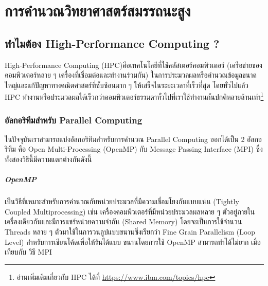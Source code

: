 

\chapter{การคำนวณวิทยาศาสตร์สมรรถนะสูง}
\label{ch:high_perf_comp}

\section{ทำไมต้อง High-Performance Computing ?}

High-Performance Computing (HPC)คือเทคโนโลยีที่ใช้คลัสเตอร์คอมพิวเตอร์ (เครือข่ายของคอมพิวเตอร์หลาย ๆ เครื่องที่เชื่อมต่อและทำงานร่วมกัน)
ในการประมวลผลหรือคำนวณข้อมูลขนาดใหญ่และแก้ปัญหาทางคณิตศาสตร์ที่ซับซ้อนมาก ๆ ให้เสร็จในระยะเวลาที่เร็วที่สุด โดยทั่วไปแล้ว HPC
ทำงานหรือประมวลผลได้เร็วกว่าคอมพิวเตอร์ธรรมดาทั่วไปที่เราใช้ทำงานกันปกติหลายล้านเท่า\footnote{อ่านเพิ่มเติมเกี่ยวกับ HPC ได้ที่
  \url{https://www.ibm.com/topics/hpc}}

\subsection{อัลกอริทึมสำหรับ Parallel Computing}

ในปัจจุบันเราสามารถแบ่งอัลกอริทึมสำหรับการคำนวณ Parallel Computing ออกได้เป็น 2 อัลกอริทึม คือ Open Multi-Processing (OpenMP)
กับ Message Passing Interface (MPI) ซึ่งทั้งสองวิธีนี้มีความแตกต่างกันดังนี้

\paragraph{OpenMP}
เป็นวิธีที่เหมาะสำหรับการคำนวณกับหน่วยประมวลที่มีความเชื่อมโยงกันแบบแน่น (Tightly Coupled Multiprocessing) เช่น
เครื่องคอมพิวเตอร์ที่มีหน่วยประมวลผลหลาย ๆ ตัวอยู่ภายในเครื่องเดียวกันและมีการแชร์หน่วยความจำกัน (Shared Memory) โดยจะเป็นการใช้จำนวน
Threads หลาย ๆ ตัวมาใช้ในการวนลูปแบบขนานซึ่งเรียกว่า Fine Grain Parallelism (Loop Level) สำหรับการเขียนโค้ดเพื่อให้รันได้แบบ%
ขนานโดยการใช้ OpenMP สามารถทำได้ไม่ยาก เมื่อเทียบกับ วิธี MPI

